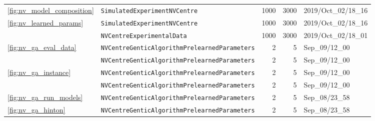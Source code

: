 \begin{tabular}{llrrl}
\cref{fig:nv_model_composition} & \texttt{SimulatedExperimentNVCentre} &                                     1000 &                                     3000 &                      2019/Oct\_02/18\_16 \\
\multirow{2}{*}{\cref{fig:nv_learned_params}} & \texttt{SimulatedExperimentNVCentre} &                                     1000 &                                     3000 &                      2019/Oct\_02/18\_16 \\
                        & \texttt{NVCentreExperimentalData} &                                     1000 &                                     3000 &                      2019/Oct\_02/18\_01 \\
\cline{1-5}
\multirow{2}{*}{\cref{fig:nv_ga_eval_data}} & \texttt{NVCentreGenticAlgorithmPrelearnedParameters} &                                        2 &                                        5 &                           Sep\_09/12\_00 \\
                        & \texttt{NVCentreGenticAlgorithmPrelearnedParameters} &                                        2 &                                        5 &                           Sep\_09/12\_00 \\
\cline{1-5}
\multirow{2}{*}{\cref{fig:nv_ga_instance}} & \texttt{NVCentreGenticAlgorithmPrelearnedParameters} &                                        2 &                                        5 &                           Sep\_09/12\_00 \\
                        & \texttt{NVCentreGenticAlgorithmPrelearnedParameters} &                                        2 &                                        5 &                           Sep\_09/12\_00 \\
\cline{1-5}
\cref{fig:nv_ga_run_models} & \texttt{NVCentreGenticAlgorithmPrelearnedParameters} &                                        2 &                                        5 &                           Sep\_08/23\_58 \\
\cref{fig:nv_ga_hinton} & \texttt{NVCentreGenticAlgorithmPrelearnedParameters} &                                        2 &                                        5 &                           Sep\_08/23\_58 \\
\hline
\end{tabular}

